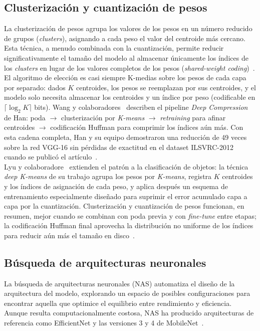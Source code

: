 \documentclass[a4paper,12pt,twoside,final]{book}
\begin{document}
\subsection{Clusterización y cuantización de pesos}
La clusterización de pesos agrupa los valores de los pesos en un número reducido de grupos (\textit{clusters}),
asignando a cada peso el valor del centroide más cercano. Esta técnica, a menudo combinada con la cuantización,
permite reducir significativamente el tamaño del modelo al almacenar únicamente los índices de los \textit{clusters}
en lugar de los valores completos de los pesos (\textit{shared-weight coding})~\cite{liang2021neucom,wang2019acm}.\\

El algoritmo de elección es casi siempre K-medias sobre los pesos de cada capa por separado: dados $K$ centroides,
los pesos se reemplazan por sus centroides, y el modelo solo necesita almacenar los centroides y un índice por peso
(codificable en $\lceil\log_2 K\rceil$ bits). Wang y colaboradores~\cite{wang2019acm} describen el pipeline
\textit{Deep Compression} de Han: poda $\rightarrow$ clusterización por \textit{K-means} $\rightarrow$
\textit{retraining} para afinar centroides $\rightarrow$ codificación Huffman para comprimir los índices aún más.
Con esta cadena completa, Han y su equipo demostraron una reducción de 49 veces sobre la red VGG-16 sin pérdidas de
exactitud en el dataset ILSVRC-2012 cuando se publicó el artículo~\cite{liang2021neucom}.\\

Lyu y colaboradore~\cite{lyu2024multimedtools} extienden el patrón a la clasificación de objetos: la técnica
\textit{deep K-means} de su trabajo agrupa los pesos por \textit{K-means}, registra $K$ centroides y los índices de
asignación de cada peso, y aplica después un esquema de entrenamiento especialmente diseñado para suprimir el error
acumulado capa a capa por la cuantización. Clusterización y cuantización de pesos funcionan, en resumen, mejor cuando
se combinan con poda previa y con \textit{fine-tune} entre etapas; la codificación Huffman final aprovecha la
distribución no uniforme de los índices para reducir aún más el tamaño en disco~\cite{liang2021neucom,wang2019acm}.

\subsection{Búsqueda de arquitecturas neuronales}
La búsqueda de arquitecturas neuronales (NAS) automatiza el diseño de la arquitectura del modelo, explorando un
espacio de posibles configuraciones para encontrar aquella que optimice el equilibrio entre rendimiento y eficiencia.
Aunque resulta computacionalmente costosa, NAS ha producido arquitecturas de referencia como EfficientNet y las
versiones 3 y 4 de MobileNet~\cite{banbury2020mlperf}.\\
\end{document}

